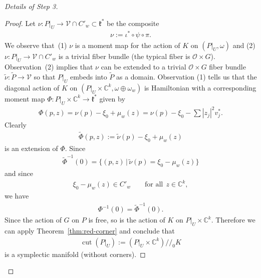 \documentclass[pdftex]{sigma}
\numberwithin{equation}{section}
\begin{document}
\begin{proof}[Details of Step 3]
\begin{proof}
Let $\nu\colon P|_U\to {\mathcal V}\cap C'_w \subset {\mathfrak k}^*$ be the composite
\begin{gather*}
\nu:= \iota^*\circ \psi \circ \pi.
\end{gather*}
We observe that~(1) $\nu$ is a moment map for the action of $K$ on
$(P|_U, \omega)$ and (2) $\nu\colon P|_U\to {\mathcal V}\cap C'_w$ is a trivial
f\/iber bundle (the typical f\/iber is ${\mathcal O}\times G$). Observation~(2)
implies that $\nu$ can be extended to a trivial ${\mathcal O}\times G$ f\/iber
bundle $\tilde{\nu}\colon \tilde{P} \to {\mathcal V}$ so that $P|_U$ embeds into
$\tilde{P}$ as a domain.  Observation (1) tells us that the diagonal
action of $K$ on $(P|_U\times {\mathbb C}^k, \omega\oplus \omega_w)$ is
Hamiltonian with a corresponding moment map
$\Phi \colon  P|_U \times {\mathbb C}^k \to {\mathfrak k}^*$ given by
\begin{gather*}
\Phi(p,z) = \nu(p) -\xi_0+ \mu_w (z) = \nu(p) -\xi_0 -\sum |z_j|^2 v_j^*.
\end{gather*}
Clearly
\begin{gather*}
\tilde{\Phi}(p,z) := \tilde{\nu}(p) -\xi_0 + \mu_w (z)
\end{gather*}
is an extension of $\Phi$. Since
\begin{gather*}
\tilde{\Phi}^{-1} (0) = \{(p,z)\,|\, \tilde{\nu}(p) = \xi_0-\mu_w(z)\}
\end{gather*}
and since
\begin{gather*}
\xi_0-\mu_w(z)\in C'_w \qquad \textrm{for all} \ \ z\in {\mathbb C}^k,
\end{gather*}
we have
\begin{gather*}
\Phi^{-1} (0) = \tilde{\Phi}^{-1} (0).
\end{gather*}
Since the action of $G$ on $P$ is free, so is the action of $K$ on
$P|_U\times {\mathbb C}^k$.  Therefore we can apply
Theorem~\ref{thm:red-corner} and conclude that
\begin{gather*}
\operatorname{cut}(P|_U):= (P|_U\times {\mathbb C}^k)/\!/_0 K
\end{gather*}
is a symplectic manifold (without corners).


\end{proof}
\end{proof}
\end{document}
